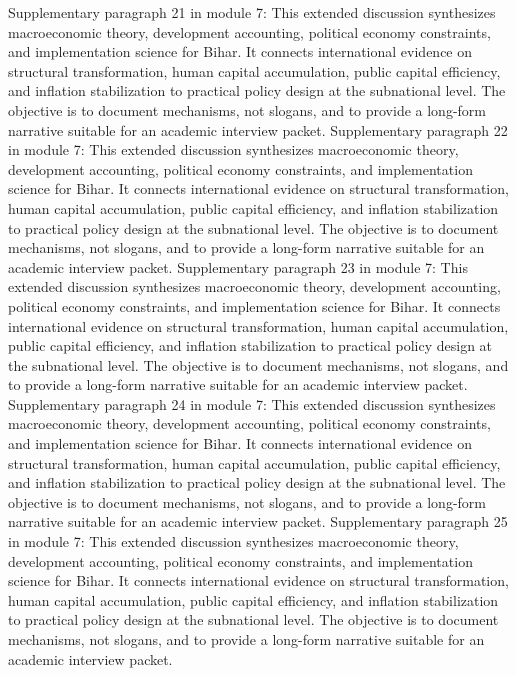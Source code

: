 \documentclass[preprint,12pt]{elsarticle}
\begin{document}
Supplementary paragraph 21 in module 7: This extended discussion synthesizes macroeconomic theory, development accounting, political economy constraints, and implementation science for Bihar. It connects international evidence on structural transformation, human capital accumulation, public capital efficiency, and inflation stabilization to practical policy design at the subnational level. The objective is to document mechanisms, not slogans, and to provide a long-form narrative suitable for an academic interview packet.
Supplementary paragraph 22 in module 7: This extended discussion synthesizes macroeconomic theory, development accounting, political economy constraints, and implementation science for Bihar. It connects international evidence on structural transformation, human capital accumulation, public capital efficiency, and inflation stabilization to practical policy design at the subnational level. The objective is to document mechanisms, not slogans, and to provide a long-form narrative suitable for an academic interview packet.
Supplementary paragraph 23 in module 7: This extended discussion synthesizes macroeconomic theory, development accounting, political economy constraints, and implementation science for Bihar. It connects international evidence on structural transformation, human capital accumulation, public capital efficiency, and inflation stabilization to practical policy design at the subnational level. The objective is to document mechanisms, not slogans, and to provide a long-form narrative suitable for an academic interview packet.
Supplementary paragraph 24 in module 7: This extended discussion synthesizes macroeconomic theory, development accounting, political economy constraints, and implementation science for Bihar. It connects international evidence on structural transformation, human capital accumulation, public capital efficiency, and inflation stabilization to practical policy design at the subnational level. The objective is to document mechanisms, not slogans, and to provide a long-form narrative suitable for an academic interview packet.
Supplementary paragraph 25 in module 7: This extended discussion synthesizes macroeconomic theory, development accounting, political economy constraints, and implementation science for Bihar. It connects international evidence on structural transformation, human capital accumulation, public capital efficiency, and inflation stabilization to practical policy design at the subnational level. The objective is to document mechanisms, not slogans, and to provide a long-form narrative suitable for an academic interview packet.
\end{document}
